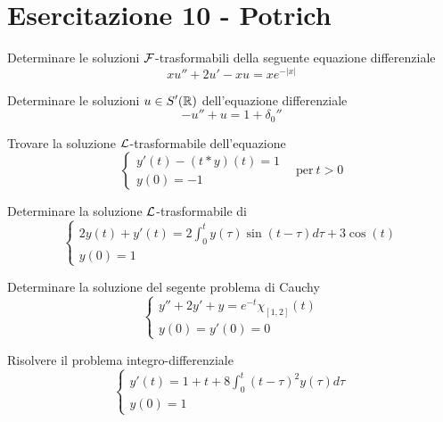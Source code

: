 \chapter{Esercitazione 10 - Potrich}
\ParteEsercizi
\Esercizio{}

Determinare le soluzioni $\displaystyle \mathcal{F} $-trasformabili della seguente equazione differenziale
\begin{equation*}
xu''+2u'-xu=xe^{-| x| }
\end{equation*}
\Esercizio{}

Determinare le soluzioni $\displaystyle u\in S'(\mathbb{R} )$ dell'equazione differenziale
\begin{equation*}
-u''+u=1+\delta _{0} ''
\end{equation*}
\Esercizio{}

Trovare la soluzione $\mathcal{L}$-trasformabile dell'equazione
\begin{equation*}
\begin{cases}
y'( t) -( t*y)( t) =1\\
y( 0) =-1
\end{cases} \ \ \ \ \text{per} \ t >0
\end{equation*}
\Esercizio{}

Determinare la soluzione $\mathcal{L}$-trasformabile di
\begin{equation*}
\begin{cases}
2y( t) +y'( t) =2\int ^{t}_{0} y( \tau )\sin( t-\tau ) d\tau +3\cos( t)\\
y( 0) =1
\end{cases}
\end{equation*}
\Esercizio{}

Determinare la soluzione del segente problema di Cauchy
\begin{equation*}
\begin{cases}
y''+2y'+y=e^{-t} \chi _{[ 1,2]}( t)\\
y( 0) =y'( 0) =0
\end{cases}
\end{equation*}
\Esercizio{}

Risolvere il problema integro-differenziale
\begin{equation*}
\begin{cases}
y'( t) =1+t+8\int ^{t}_{0}( t-\tau )^{2} y( \tau ) d\tau \\
y( 0) =1
\end{cases}
\end{equation*}
\ParteSoluzioni
\Soluzione

